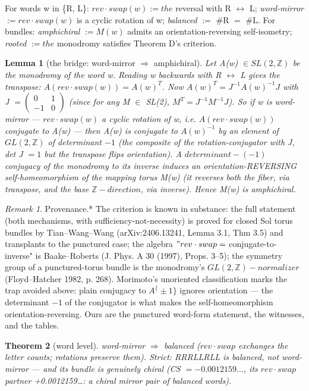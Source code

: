 \documentclass[11pt]{article}
\theoremstyle{plain}
\newtheorem{theorem}{Theorem}[section]
\newtheorem{lemma}[theorem]{Lemma}
\theoremstyle{definition}
\theoremstyle{remark}
\newtheorem*{remark}{Remark}
\begin{document}
For words w in \{R, L\}: \(rev\cdot swap(w) := the\) reversal with R \(\leftrightarrow \) L; \emph{word-mirror} \(:= rev\cdot swap(w)\) is a cyclic rotation of w; \emph{balanced} \(:=\) \#R \(=\) \#L. For bundles: \emph{amphichiral} \(:= M(w)\) admits an orientation-reversing self-isometry; \emph{rooted} \(:= the\) monodromy satisfies Theorem D's criterion.

\begin{lemma}[the bridge: word-mirror \(\Longrightarrow \) amphichiral]
Let A(w) \(\in  SL(2,\mathbb{Z})\) be the monodromy of the word w. Reading w backwards with R \(\leftrightarrow \) L gives the transpose: \(A(rev\cdot swap(w)) = A(w)^{T}\). Now \(A(w)^{T} = J^{-1}A(w)^{-1}J\) with J \(= \left(\begin{smallmatrix}0 & 1\\-1 & 0\end{smallmatrix}\right)\) (since for any M \(\in \) SL(2), \(M^{T} = J^{-1}M^{-1}J\)). So if w is word-mirror — \(rev\cdot swap(w)\) a cyclic rotation of w, i.e. \(A(rev\cdot swap(w))\) conjugate to A(w) — then A(w) is conjugate to \(A(w)^{-1}\) by an element of \(GL(2,\mathbb{Z})\) of determinant \(-1\) (the composite of the rotation-conjugator with J, det J \(= 1\) but the transpose flips orientation). A \(determinant-(-1)\) conjugacy of the monodromy to its inverse induces an orientation-REVERSING self-homeomorphism of the mapping torus M(w) (it reverses both the fiber, via transpose, and the base \(\mathbb{Z}-direction\), via inverse). Hence M(w) is amphichiral. 
\end{lemma}

\begin{remark}Provenance.* The criterion is known in substance: the full statement (both mechanisms, with sufficiency-not-necessity) is proved for closed Sol torus bundles by Tian–Wang–Wang (arXiv:2406.13241, Lemma 3.1, Thm 3.5) and transplants to the punctured case; the algebra \("rev\cdot swap =\) conjugate-to-inverse" is Baake–Roberts (J. Phys. A 30 (1997), Props. 3–5); the symmetry group of a punctured-torus bundle is the monodromy's \(GL(2,\mathbb{Z})-normalizer\) (Floyd–Hatcher 1982, p. 268). Morimoto's unoriented classification marks the trap avoided above: plain conjugacy to \(A^\{\pm 1\}\) ignores orientation — the determinant \(-1\) of the conjugator is what makes the self-homeomorphism orientation-reversing. Ours are the punctured word-form statement, the witnesses, and the tables.\end{remark}

\begin{theorem}[word level]
word-mirror \(\Longrightarrow \) balanced (\(rev\cdot swap\) exchanges the letter counts; rotations preserve them). Strict: RRRLLRLL is balanced, not word-mirror — and its bundle is genuinely chiral (CS \(= -0.0012159…\), its \(rev\cdot swap\) partner +0.0012159…: a chiral mirror pair of balanced words).
\end{theorem}
\end{document}
